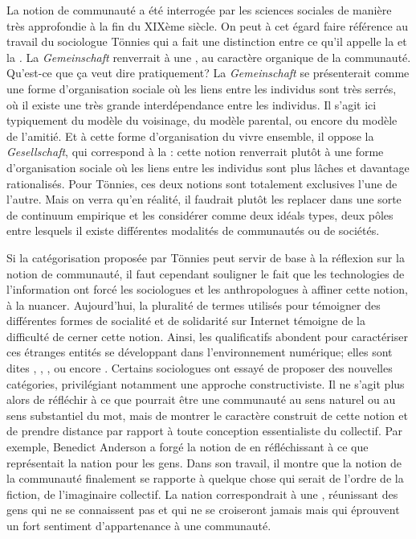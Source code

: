 {La notion de communaut\'e a \'et\'e interrog\'ee par les sciences sociales de mani\`ere tr\`es approfondie \`a la fin du XIX\`eme si\`ecle. On peut \`a cet \'egard faire r\'ef\'erence au travail du sociologue T\"onnies qui a fait une distinction entre ce qu'il appelle la {\em {}} et la {\em {}.} La {\em Gemeinschaft} renverrait \`a une , au caract\`ere organique de la communaut\'e. Qu'est{}-ce que \c{c}a veut dire pratiquement? La {\em Gemeinschaft} se pr\'esenterait comme une forme d'organisation sociale o\`u les liens entre les individus sont tr\`es serr\'es, o\`u il existe une tr\`es grande interd\'ependance entre les individus. Il s'agit ici typiquement du mod\`ele du voisinage, du mod\`ele parental, ou encore du mod\`ele de l'amiti\'e. Et \`a cette forme d'organisation du vivre ensemble, il oppose la {\em Gesellschaft}, qui correspond \`a la : cette notion renverrait plut\^ot \`a une forme d'organisation sociale o\`u les liens entre les individus sont plus l\^aches et davantage rationalis\'es. Pour T\"onnies, ces deux notions sont totalement exclusives l'une de l'autre. Mais on verra qu'en r\'ealit\'e, il faudrait plut\^ot les replacer dans une sorte de continuum empirique et les consid\'erer comme deux id\'eals types, deux p\^oles entre lesquels il existe diff\'erentes modalit\'es de communaut\'es ou de soci\'et\'es.

Si la cat\'egorisation propos\'ee par T\"onnies peut servir de base \`a la r\'eflexion sur la notion de communaut\'e, il faut cependant souligner le fait que les technologies de l'information ont forc\'e les sociologues et les anthropologues \`a affiner cette notion, \`a la nuancer. Aujourd'hui, la pluralit\'e de termes utilis\'es pour t\'emoigner des diff\'erentes formes de socialit\'e et de solidarit\'e sur Internet t\'emoigne de la difficult\'e de cerner cette notion. Ainsi, les qualificatifs abondent pour caract\'eriser ces \'etranges entit\'es se d\'eveloppant dans l'environnement num\'erique; elles sont dites , , ,  ou encore . Certains sociologues ont essay\'e de proposer des nouvelles cat\'egories, privil\'egiant notamment une approche constructiviste. Il ne s'agit plus alors de r\'efl\'echir \`a ce que pourrait \^etre une communaut\'e au sens naturel ou au sens substantiel du mot, mais de montrer le caract\`ere construit de cette notion et de prendre distance par rapport \`a toute conception essentialiste du collectif. Par exemple, Benedict Anderson a forg\'e la notion de  en r\'efl\'echissant \`a ce que repr\'esentait la nation pour les gens. Dans son travail, il montre que la notion de la communaut\'e finalement se rapporte \`a quelque chose qui serait de l'ordre de la fiction, de l'imaginaire collectif. La nation correspondrait \`a une , r\'eunissant des gens qui ne se connaissent pas et qui ne se croiseront jamais mais qui \'eprouvent un fort sentiment d'appartenance \`a une communaut\'e.

}
